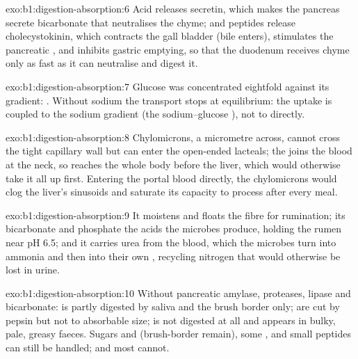\begin{solution}{exo:b1:digestion-absorption:6}
Acid releases secretin, which makes the pancreas secrete bicarbonate
that neutralises the chyme;  and peptides release cholecystokinin,
which contracts the gall bladder (bile enters), stimulates the
pancreatic , and inhibits gastric emptying, so that the
duodenum receives chyme only as fast as it can neutralise and digest
it.
\end{solution}

\begin{solution}{exo:b1:digestion-absorption:7}
Glucose was concentrated eightfold against its gradient: . Without sodium the transport stops at equilibrium: the
uptake is coupled to the sodium gradient (the sodium--glucose
), not to  directly.
\end{solution}

\begin{solution}{exo:b1:digestion-absorption:8}
Chylomicrons, a micrometre across, cannot cross the tight capillary
wall but can enter the open-ended lacteals; the  joins the blood
at the neck, so  reaches the whole body before the liver, which
would otherwise take it all up first. Entering the portal blood
directly, the chylomicrons would clog the liver's sinusoids and
saturate its capacity to process  after every meal.
\end{solution}

\begin{solution}{exo:b1:digestion-absorption:9}
It moistens and floats the fibre for rumination; its bicarbonate and
phosphate  the acids the microbes produce, holding the rumen
near pH 6.5; and it carries urea from the blood, which the microbes
turn into ammonia and then into their own , recycling nitrogen
that would otherwise be lost in urine.
\end{solution}

\begin{solution}{exo:b1:digestion-absorption:10}
Without pancreatic amylase, proteases, lipase and bicarbonate: 
is partly digested by saliva and the brush border only;  are
cut by pepsin but not to absorbable size;  is not digested at all
and appears in bulky, pale, greasy faeces. Sugars and 
(brush-border  remain), some , and small peptides can
still be handled;  and most  cannot.
\end{solution}

